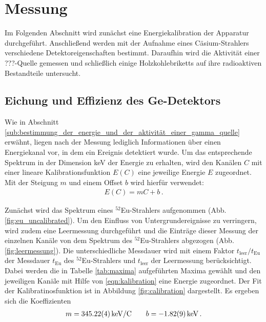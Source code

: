 \section{Messung}
\label{sec:messung}
Im Folgenden Abschnitt wird zunächst eine Energiekalibration der Apparatur durchgeführt. Anschließend werden mit der Aufnahme eines Cäsium-Strahlers verschiedene Detektoreigenschaften bestimmt.
Daraufhin wird die Aktivität einer ???-Quelle gemessen und schließlich einige Holzkohlebriketts auf ihre radioaktiven Bestandteile untersucht.

\subsection{Eichung und Effizienz des Ge-Detektors}
\label{subse:eichung}
Wie in Abschnitt \ref{sub:bestimmung_der_energie_und_der_aktivität_einer_gamma_quelle} erwähnt, liegen nach der Messung lediglich Informationen über einen Energiekanal vor, in dem ein Ereignis detektiert wurde.
Um das entsprechende Spektrum in der Dimension \si{keV} der Energie zu erhalten, wird den Kanälen $C$ mit einer lineare Kalibrationsfunktion $E(C)$ eine jeweilige Energie $E$ zugeordnet.
Mit der Steigung $m$ und einem Offset $b$ wird hierfür verwendet:%
%
\begin{align}
    \label{eqn:kalibration}
    E(C) = mC + b\,.
\end{align}

Zunächst wird das Spektrum eines $^{52}$Eu-Strahlers aufgenommen (Abb. \ref{fig:eu_uncalibrated}).
Um den Einfluss von Untergrundereignisse zu verringern, wird zudem eine Leermessung durchgeführt und die Einträge dieser Messung der einzelnen Kanäle von dem Spektrum des $^{52}$Eu-Strahlers abgezogen (Abb. \ref{fig:leermessung}).
Die unterschiedliche Messdauer wird mit einem Faktor $t_\text{leer} / t_\text{Eu}$ der Messdauer $t_\text{Eu}$ des $^{52}$Eu-Strahlers und $t_\text{leer}$ der Leermessung berücksichtigt.
Dabei werden die in Tabelle \ref{tab:maxima} aufgeführten Maxima gewählt und den jeweiligen Kanäle mit Hilfe von \eqref{eqn:kalibration} eine Energie zugeordnet. Der Fit der Kalibratinosfunktion ist in Abbildung \ref{fig:calibration} dargestellt.
Es ergeben sich die Koeffizienten
%
\begin{align*}
     m = \SI{345.22+-0.04}{keV/C} \qquad b = \SI{-1.82+-0.09}{keV} \,.
\end{align*}

